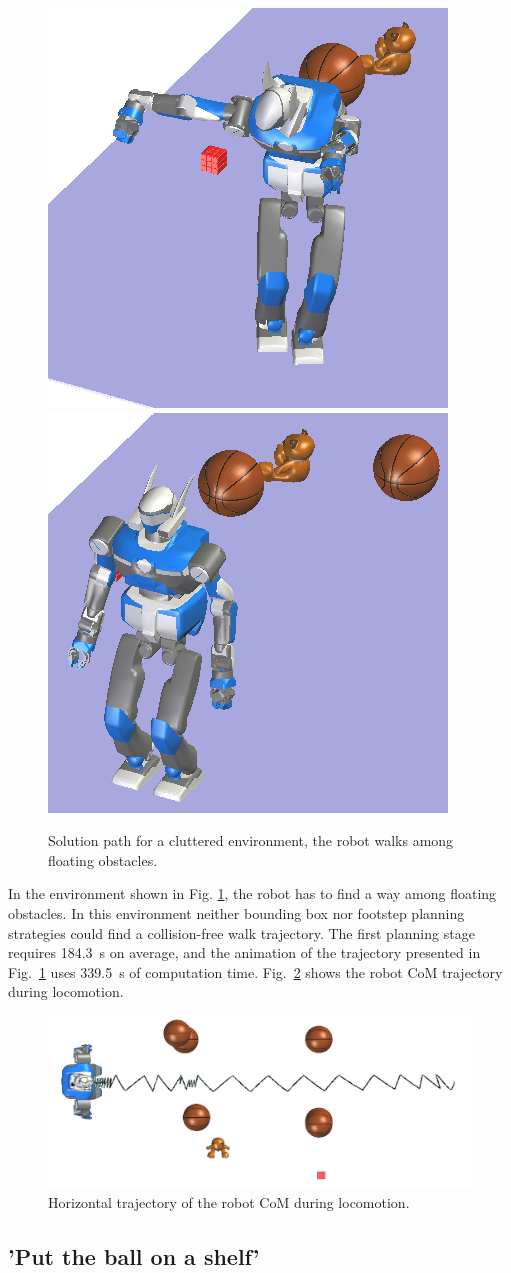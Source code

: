 \documentclass{article}
\begin{document}
\begin{figure}[h!]
\includegraphics[width=0.24\linewidth]{pics/objects-cloud/perspective-7.png}
\includegraphics[width=0.24\linewidth]{pics/objects-cloud/perspective-8.png}

\caption{Solution path for a cluttered environment, the robot walks
  among floating obstacles.}
\label{fig:cluttered}
\end{figure}

In the environment shown in Fig. \ref{fig:cluttered}, the robot
has to find a way among floating obstacles. In this
environment neither bounding box nor footstep planning strategies
could find a collision-free walk trajectory.
The first planning stage requires
184.3~s on average, and the animation of the trajectory presented in 
Fig.~\ref{fig:cluttered} uses 339.5~s of computation time. Fig.~\ref{fig:cluttered-waist} 
shows the robot CoM trajectory during locomotion.

\begin{figure}[h!]
  \centering
  \includegraphics[width=0.7\linewidth]{pics/objects-cloud/waist-trajectory.png}

  \caption{Horizontal trajectory of the robot CoM during
    locomotion.}
  \label{fig:cluttered-waist} 
\end{figure}


\subsection{'Put the ball on a shelf'}
\end{document}
